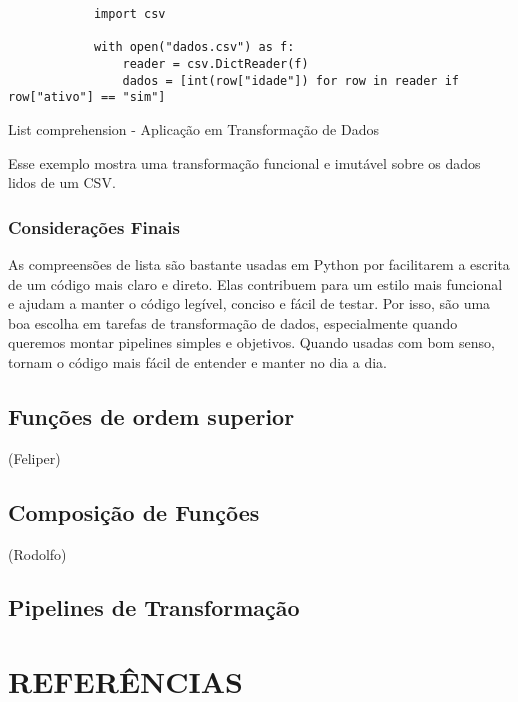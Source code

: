 \documentclass[date,twocolumn,a4paper]{ppgem}
\begin{document}
    \begin{listing}[!ht]
        \begin{verbatim}
            import csv

            with open("dados.csv") as f:
                reader = csv.DictReader(f)
                dados = [int(row["idade"]) for row in reader if row["ativo"] == "sim"]
        \end{verbatim}
        \caption{List comprehension - Aplicação em Transformação de Dados}
        \label{listing:2}
    \end{listing}

    Esse exemplo mostra uma transformação funcional e imutável sobre os dados lidos de um CSV.

    \subsubsection{Considerações Finais}
    As compreensões de lista são bastante usadas em Python por facilitarem a escrita de um código mais claro e direto. Elas contribuem para um estilo mais funcional e ajudam a manter o código legível, conciso e fácil de testar. Por isso, são uma boa escolha em tarefas de transformação de dados, especialmente quando queremos montar pipelines simples e objetivos. Quando usadas com bom senso, tornam o código mais fácil de entender e manter no dia a dia.

    \subsection{Funções de ordem superior}
    (Feliper)
    \subsection{Composição de Funções}
    (Rodolfo)
    \subsection{Pipelines de Transformação}

    \section{REFERÊNCIAS}\\
    
\end{document}

